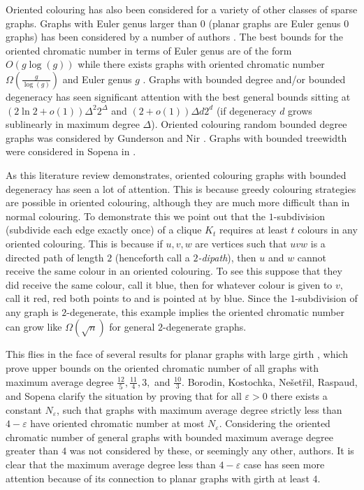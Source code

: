 \documentclass[11pt]{article}
\theoremstyle{definition}
\def\epsilon{\varepsilon}
\begin{document}
Oriented colouring has also been considered for a variety of other classes of sparse graphs.
Graphs with Euler genus larger than $0$ (planar graphs are Euler genus $0$ graphs)
has been considered by a number of authors \cite{aravind2013forbidden,BRADSHAW2025,clow2026oriented,kostochka1997acyclic}.
The best bounds for the oriented chromatic number in terms of Euler genus
are of the form $O(g\log(g))$ while there exists graphs with oriented chromatic number $\Omega(\frac{g}{\log(g)})$ and Euler genus $g$ \cite{clow2026oriented}.
Graphs with bounded degree and/or bounded degeneracy has seen significant attention \cite{CLOW2026,das2017chromatic, duffy2020colourings, duffy2019oriented,dybizbanski2020oriented,kostochka1997acyclic,sopena1997chromatic,sopena1996note} with the best general bounds sitting at 
$(2\ln2 +o(1))\Delta^2 2^\Delta$ and $(2+o(1))\Delta d2^d$ (if degeneracy $d$ grows sublinearly in maximum degree $\Delta$).
Oriented colouring random bounded degree graphs was considered by Gunderson and Nir \cite{gunderson2022oriented}.
Graphs with bounded treewidth were considered in Sopena in \cite{sopena1997chromatic}.

As this literature review demonstrates, oriented colouring 
graphs with bounded degeneracy has seen a lot of attention.
This is because greedy colouring strategies are possible in oriented colouring, 
although they are much more difficult than in normal colouring.
To demonstrate this we point out that the $1$-subdivision (subdivide each edge exactly once) of a clique $K_t$ requires at least $t$
colours in any oriented colouring.
This is because if $u,v,w$ are vertices such that $uvw$ is a directed path of length $2$ (henceforth call a \emph{$2$-dipath}),
then $u$ and $w$ cannot receive the same colour in an oriented colouring.
To see this suppose that they did receive the same colour, call it blue,
then for whatever colour is given to $v$, call it red, red both points to and is pointed at by blue.
Since the $1$-subdivision of any graph is $2$-degenerate, this example implies the oriented chromatic number can grow like $\Omega(\sqrt{n})$
for general $2$-degenerate graphs. 

This flies in the face of several results for planar graphs with large girth \cite{borodin2007oriented, borodin1999maximum,pinlou2009oriented},
which prove upper bounds on the oriented chromatic number of all graphs with maximum average degree $\frac{12}{5}, \frac{11}{4},3,$ and $ \frac{10}{3}$.
Borodin, Kostochka, Ne{\v{s}}et{\v{r}}il, Raspaud, and Sopena \cite{borodin1999maximum}
clarify the situation by proving that for all $\epsilon>0$ there exists a constant $N_\epsilon$,
such that
graphs with maximum average degree strictly less than $4-\epsilon$
have oriented chromatic number at most $N_\epsilon$.
Considering the oriented chromatic number of general graphs with bounded maximum average degree greater than $4$ 
was not considered by these, or seemingly any other, authors.
It is clear that the maximum average degree less than $4-\epsilon$ case has seen more attention
because of its connection to planar graphs with girth at least $4$.
\end{document}
